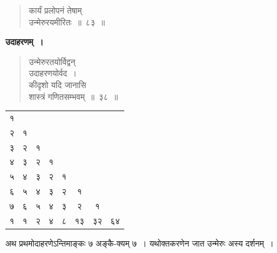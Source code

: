 \documentclass[11pt, openany]{book}
\begin{document}
\newpage

\begin{quote}
{\gk कार्यं प्रलोपनं तेषाम्\\
उन्मेरुरयमीरितः~॥~८३~॥}
\end{quote}

\textbf{उदाहरणम्~।}

\begin{quote}
{\ex उन्मेरुरतयोर्विद्वन्\\
उदाहरणयोर्वद~।\\
कीदृशो यदि जानासि\\
शास्त्रं गणितसम्भवम्~॥~३८~॥	}
\end{quote}
\vspace{2mm}

\begin{tabular}{|c|c|c|c|c|c|c|c|}
	\cline{1-1}
{\hbox{१}} & \multicolumn{1}{c}{} & \multicolumn{1}{c}{} & \multicolumn{1}{c}{} & \multicolumn{1}{c}{} & \multicolumn{1}{c}{} & \multicolumn{1}{c}{} & \multicolumn{1}{c}{}\\
\cline{1-2}
{\hbox{२}} & {\hbox{१}} & \multicolumn{1}{c}{} & \multicolumn{1}{c}{} & \multicolumn{1}{c}{} & \multicolumn{1}{c}{} & \multicolumn{1}{c}{} & \multicolumn{1}{c}{}\\
\cline{1-3}
{\hbox{३}} & {\hbox{२}} &{\hbox{१}} & \multicolumn{1}{c}{} & \multicolumn{1}{c}{} & \multicolumn{1}{c}{} & \multicolumn{1}{c}{} & \multicolumn{1}{c}{}\\
\cline{1-4}
{\hbox{४}} & {\hbox{३}} &{\hbox{२}} & {\hbox{१}}& \multicolumn{1}{c}{} & \multicolumn{1}{c}{} & \multicolumn{1}{c}{} & \multicolumn{1}{c}{}\\
\cline{1-5}
{\hbox{५}} & {\hbox{४}} &{\hbox{३}} & {\hbox{२}}& {\hbox{१}} & \multicolumn{1}{c}{} & \multicolumn{1}{c}{} & \multicolumn{1}{c}{}\\
\cline{1-6}
{\hbox{६}} &{\hbox{५}} & {\hbox{४}} &{\hbox{३}} & {\hbox{२}}& {\hbox{१}}  & \multicolumn{1}{c}{} & \multicolumn{1}{c}{}\\
\cline{1-7}
 {\hbox{७}} & {\hbox{६}} &{\hbox{५}} & {\hbox{४}} &{\hbox{३}} & {\hbox{२}}& {\hbox{१}}  & \multicolumn{1}{c}{} \\
\cline{1-7}
\cline{1-8}
{\hbox{१} }& {\hbox{१}} & {\hbox{२}} &{\hbox{४}} & {\hbox{८}} &{\hbox{१३}} & {\hbox{३२}}& {\hbox{६४}}  \\
\cline{1-8}
\end{tabular} 
\begin{minipage}[]{0.45\textwidth}
\vspace{-10mm}
अथ प्रथमोदाहरणेऽन्तिमाङ्कः ७ अङ्कै-क्यम् ७~। यथोक्तकरणेन जात उन्मेरुः अस्य दर्शनम्~।
\end{minipage}
\vspace{8mm}
\end{document}
